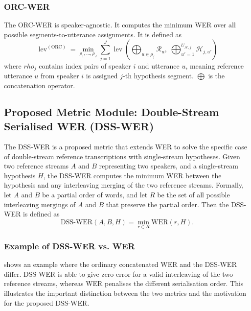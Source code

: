 \subsubsection{ORC-WER}
The ORC-WER is speaker-agnostic. It computes the minimum WER over all possible segments-to-utterance assignments. It is defined as 
\begin{equation}
    \operatorname{lev}^{(\mathrm{ORC})}
=
\min_{\rho_1,\ldots,\rho_J}
\sum_{j=1}^{J}
\operatorname{lev}
\left(
\bigoplus_{u \in \rho_j} \mathcal{R}_u,\;
\bigoplus_{u' = 1}^{U_{\mathcal{H},j}} \mathcal{H}_{j,u'}
\right)
\end{equation}
where $rho_j$ contains index pairs of speaker $i$ and utterance $u$, meaning reference utterance $u$ from speaker $i$ is assigned $j$-th hypothesis segment. $\bigoplus$ is the concatenation operator.   

\subsection{Proposed Metric Module: Double-Stream Serialised WER (DSS-WER)}
The DSS-WER is a proposed metric that extends WER to solve the specific case of double-stream reference transcriptions with single-stream hypotheses. Given two reference streams $A$ and $B$ representing two speakers, and a single-stream hypothesis $H$, the DSS-WER computes the minimum WER between the hypothesis and any interleaving merging of the two reference streams. Formally, let $A$ and $B$ be a partial order of words, and let $R$ be the set of all possible interleaving mergings of $A$ and $B$ that preserve the partial order. Then the DSS-WER is defined as
\begin{equation}
\mathrm{DSS\text{-}WER}(A, B, H) = \min_{r \in R} \mathrm{WER}(r, H).
\end{equation}
\subsubsection{Example of DSS-WER vs. WER}
 shows an example where the ordinary concatenated WER and the DSS-WER differ. DSS-WER is able to give zero error for a valid interleaving of the two reference streams, whereas WER penalises the different serialisation order. This illustrates the important distinction between the two metrics and the motivation for the proposed DSS-WER.

